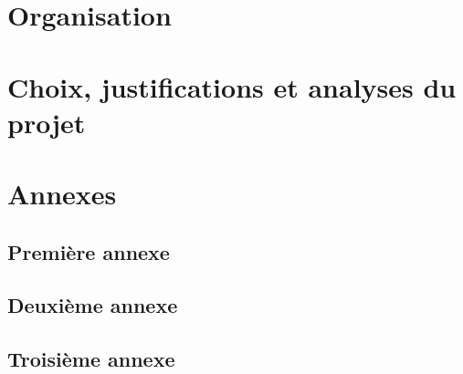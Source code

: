 \documentclass[11pt,fleqn]{book} %
\begin{document}
%
%

\part{Organisation}


\part{Choix, justifications et analyses du projet}



\appendix
\part{Annexes}
\chapter{Première annexe}
\chapter{Deuxième annexe}
\chapter{Troisième annexe}

\backmatter %



\nocite{*}

\cleardoublepage
{}
\setlength{\columnsep}{0.75cm}
\printindex

\cleardoublepage
{}
\setlength{\columnsep}{0.75cm}
\printglossaries

\end{document}
